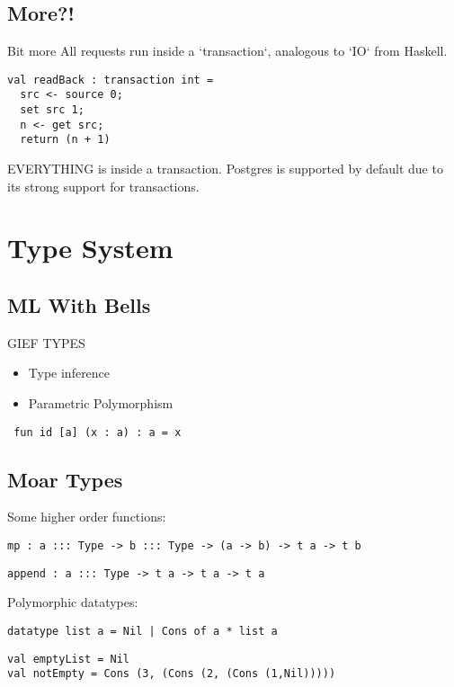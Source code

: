 \documentclass{beamer}
\begin{document}
\subsection{More?!}
\begin{frame}[fragile]{Bit more}
All requests run inside a `transaction`, analogous to `IO` from Haskell.
\begin{verbatim}
val readBack : transaction int =
  src <- source 0;
  set src 1;
  n <- get src;
  return (n + 1)
\end{verbatim}
EVERYTHING is inside a transaction. Postgres is supported by default due to its strong support for transactions.
\end{frame}

\section{Type System}
\subsection{ML With Bells}
\begin{frame}[fragile]{GIEF TYPES}
\begin{itemize}
\item Type inference
\item Parametric Polymorphism
\end{itemize}
\begin{verbatim} fun id [a] (x : a) : a = x \end{verbatim}
\end{frame}

\subsection{Moar Types}
\begin{frame}[fragile]
Some higher order functions:
\begin{verbatim}
mp : a ::: Type -> b ::: Type -> (a -> b) -> t a -> t b
\end{verbatim}
\begin{verbatim}
append : a ::: Type -> t a -> t a -> t a
\end{verbatim}
Polymorphic datatypes:
\begin{verbatim}
datatype list a = Nil | Cons of a * list a
\end{verbatim}
\begin{verbatim}
val emptyList = Nil
val notEmpty = Cons (3, (Cons (2, (Cons (1,Nil)))))
\end{verbatim}
\end{frame}
\end{document}
